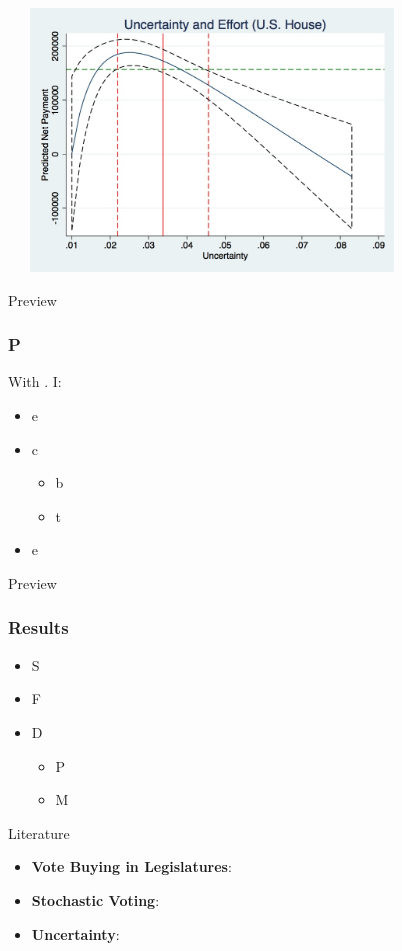 \documentclass[handout]{beamer}
\begin{document}
\begin{frame}
\includegraphics[height=2.75in, width=4.25in]{graph1.jpg}
\end{frame}


\begin{frame}{Preview}
\frametitle{P}
\pause
With . I:
\pause
\begin{itemize}[<+->]
	\item e
	\item c
		\begin{itemize}[<+->]
			\item b
			\item t
		\end{itemize}
	\item e
\end{itemize}
\end{frame}


\begin{frame}{Preview}
\frametitle{Results}

\pause
\begin{itemize}[<+->]
	\item S
	\item F
	\item D
		\begin{itemize}
			\item P
			\item M
		\end{itemize}
\end{itemize}
\end{frame}

 
\begin{frame}{Literature}
\pause
\begin{itemize}[<+->]
	\item \textbf{Vote Buying in Legislatures}: 
	\item \textbf{Stochastic Voting}: 
	\item \textbf{Uncertainty}: 
\end{itemize}
\end{frame} 
\end{document}
